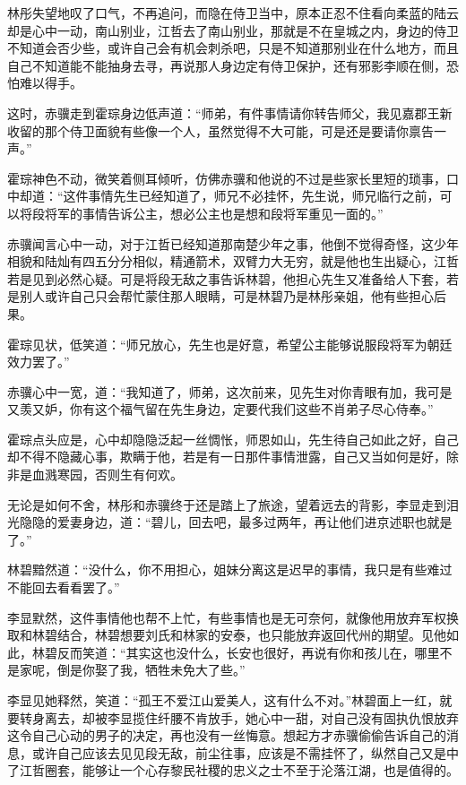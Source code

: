 林彤失望地叹了口气，不再追问，而隐在侍卫当中，原本正忍不住看向柔蓝的陆云却是心中一动，南山别业，江哲去了南山别业，那就是不在皇城之内，身边的侍卫不知道会否少些，或许自己会有机会刺杀吧，只是不知道那别业在什么地方，而且自己不知道能不能抽身去寻，再说那人身边定有侍卫保护，还有邪影李顺在侧，恐怕难以得手。

这时，赤骥走到霍琮身边低声道：“师弟，有件事情请你转告师父，我见嘉郡王新收留的那个侍卫面貌有些像一个人，虽然觉得不大可能，可是还是要请你禀告一声。”

霍琮神色不动，微笑着侧耳倾听，仿佛赤骥和他说的不过是些家长里短的琐事，口中却道：“这件事情先生已经知道了，师兄不必挂怀，先生说，师兄临行之前，可以将段将军的事情告诉公主，想必公主也是想和段将军重见一面的。”

赤骥闻言心中一动，对于江哲已经知道那南楚少年之事，他倒不觉得奇怪，这少年相貌和陆灿有四五分分相似，精通箭术，双臂力大无穷，就是他也生出疑心，江哲若是见到必然心疑。可是将段无敌之事告诉林碧，他担心先生又准备给人下套，若是别人或许自己只会帮忙蒙住那人眼睛，可是林碧乃是林彤亲姐，他有些担心后果。

霍琮见状，低笑道：“师兄放心，先生也是好意，希望公主能够说服段将军为朝廷效力罢了。”

赤骥心中一宽，道：“我知道了，师弟，这次前来，见先生对你青眼有加，我可是又羡又妒，你有这个福气留在先生身边，定要代我们这些不肖弟子尽心侍奉。”

霍琮点头应是，心中却隐隐泛起一丝惆怅，师恩如山，先生待自己如此之好，自己却不得不隐藏心事，欺瞒于他，若是有一日那件事情泄露，自己又当如何是好，除非是血溅寒园，否则生有何欢。

无论是如何不舍，林彤和赤骥终于还是踏上了旅途，望着远去的背影，李显走到泪光隐隐的爱妻身边，道：“碧儿，回去吧，最多过两年，再让他们进京述职也就是了。”

林碧黯然道：“没什么，你不用担心，姐妹分离这是迟早的事情，我只是有些难过不能回去看看罢了。”

李显默然，这件事情他也帮不上忙，有些事情也是无可奈何，就像他用放弃军权换取和林碧结合，林碧想要刘氏和林家的安泰，也只能放弃返回代州的期望。见他如此，林碧反而笑道：“其实这也没什么，长安也很好，再说有你和孩儿在，哪里不是家呢，倒是你娶了我，牺牲未免大了些。”

李显见她释然，笑道：“孤王不爱江山爱美人，这有什么不对。”林碧面上一红，就要转身离去，却被李显揽住纤腰不肯放手，她心中一甜，对自己没有固执仇恨放弃这令自己心动的男子的决定，再也没有一丝悔意。想起方才赤骥偷偷告诉自己的消息，或许自己应该去见见段无敌，前尘往事，应该是不需挂怀了，纵然自己又是中了江哲圈套，能够让一个心存黎民社稷的忠义之士不至于沦落江湖，也是值得的。

